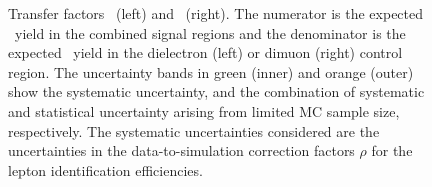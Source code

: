
\begin{figure}[htbp]
  \centering
  \caption{
    Transfer factors \RZee\ (left) and \RZmm\ (right).
    The numerator is the expected \zinvg\ yield in the combined signal regions and the denominator is the expected \zllg\ yield in the dielectron (left) or dimuon (right) control region.
    The uncertainty bands in green (inner) and orange (outer) show the systematic uncertainty, and the combination of systematic and statistical uncertainty arising from limited MC sample size, respectively. 
    The systematic uncertainties considered are the uncertainties in the data-to-simulation correction factors $\rho$ for the lepton identification efficiencies.
    }
  \label{fig:tf_z}
\end{figure}

